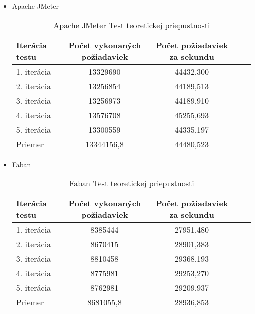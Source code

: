 \documentclass[12pt,oneside,final]{fithesis-utf8}
\begin{document}
\begin{itemize}

\item Apache JMeter

\begin{table}[H]
\begin{center}
\begin{tabular}{ | l | c | c | c | c |}
		\hline
		 \textbf{Iterácia testu} & \textbf{Počet vykonaných požiadaviek} & \textbf{Počet požiadaviek za sekundu} \\ \hline
		 1. iterácia & 13329690 & 44432,300 \\ \hline
		 2. iterácia & 13256854 & 44189,513 \\ \hline
		 3. iterácia & 13256973 & 44189,910 \\ \hline
		 4. iterácia & 13576708 & 45255,693 \\ \hline
		 5. iterácia & 13300559 & 44335,197 \\ \hline
		 Priemer & 13344156,8 & 44480,523 \\ \hline
		 
\end{tabular}
\end{center}
\caption{Apache JMeter Test teoretickej priepustnosti}
\end{table}

\item Faban

\begin{table}[H]
\begin{center}
\begin{tabular}{ | l | c | c | c | c |}
		\hline
		 \textbf{Iterácia testu} & \textbf{Počet vykonaných požiadaviek} & \textbf{Počet požiadaviek za sekundu} \\ \hline
		 1. iterácia & 8385444 & 27951,480 \\ \hline
		 2. iterácia & 8670415 & 28901,383 \\ \hline
		 3. iterácia & 8810458 & 29368,193 \\ \hline
		 4. iterácia & 8775981 & 29253,270 \\ \hline
		 5. iterácia & 8762981 & 29209,937 \\ \hline
		 Priemer & 8681055,8 & 28936,853 \\ \hline
		 
\end{tabular}
\end{center}
\caption{Faban Test teoretickej priepustnosti}
\end{table}



\end{itemize}
\end{document}
